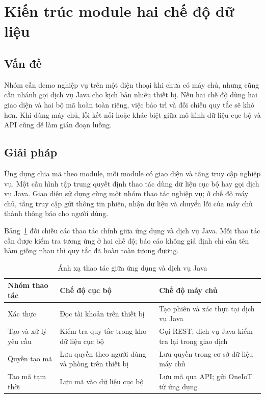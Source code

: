 \documentclass[../DoAn.tex]{subfiles}
\begin{document}
\section{Kiến trúc module hai chế độ dữ liệu}
\label{section:5.3}

\subsection{Vấn đề}
Nhóm cần demo nghiệp vụ trên một điện thoại khi chưa có máy chủ, nhưng cũng cần nhánh gọi dịch vụ Java cho kịch bản nhiều thiết bị. Nếu hai chế độ dùng hai giao diện và hai bộ mã hoàn toàn riêng, việc bảo trì và đối chiếu quy tắc sẽ khó hơn. Khi dùng máy chủ, lỗi kết nối hoặc khác biệt giữa mô hình dữ liệu cục bộ và API cũng dễ làm gián đoạn luồng.

\subsection{Giải pháp}
Ứng dụng chia mã theo module, mỗi module có giao diện và tầng truy cập nghiệp vụ. Một cấu hình tập trung quyết định thao tác dùng dữ liệu cục bộ hay gọi dịch vụ Java. Giao diện sử dụng cùng một nhóm thao tác nghiệp vụ; ở chế độ máy chủ, tầng truy cập gửi thông tin phiên, nhận dữ liệu và chuyển lỗi của máy chủ thành thông báo cho người dùng.

Bảng~\ref{tab:mapping} đối chiếu các thao tác chính giữa ứng dụng và dịch vụ Java. Mỗi thao tác cần được kiểm tra tương ứng ở hai chế độ; báo cáo không giả định chỉ cần tên hàm giống nhau thì quy tắc đã hoàn toàn tương đương.

\begin{table}[H]\centering\small\renewcommand{\arraystretch}{1.2}
\caption{Ánh xạ thao tác giữa ứng dụng và dịch vụ Java}\label{tab:mapping}
\begin{tabularx}{\textwidth}{|p{3.4cm}|X|X|}\hline
\textbf{Nhóm thao tác} & \textbf{Chế độ cục bộ} & \textbf{Chế độ máy chủ} \\ \hline
Xác thực & Đọc tài khoản trên thiết bị & Tạo phiên và xác thực tại dịch vụ Java \\ \hline
Tạo và xử lý yêu cầu & Kiểm tra quy tắc trong kho dữ liệu cục bộ & Gọi REST; dịch vụ Java kiểm tra lại trong giao dịch \\ \hline
Quyền tạo mã & Lưu quyền theo người dùng và phòng trên thiết bị & Lưu quyền trong cơ sở dữ liệu máy chủ \\ \hline
Tạo mã tạm thời & Lưu mã vào dữ liệu cục bộ & Lưu mã qua API; gửi OneIoT từ ứng dụng \\ \hline
\end{tabularx}\end{table}
\end{document}

